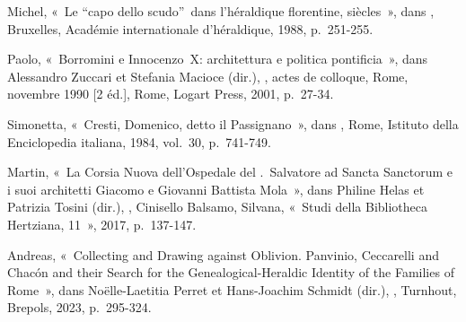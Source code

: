 \begin{teiElement}[name={TEI},change={commons\_edition}]
\begin{teiElement}[name={text},type={book},xmlid={book}]
\begin{teiElement}[name={group},type={book},xmlid={book-001}]
\begin{teiElement}[name={group},type={bibliography},data-page-title={Sources et bibliographie},data-include-href={Ch14\_Source\_bibliographie.xml},xmlid={bibliography-001}]
\begin{teiElement}[name={body}]
\begin{teiDiv}[type={section1},xmlid={div18}]
\begin{teiDiv}[type={section2},xmlid={div19}]
\begin{teiBibl}[xmlid={bibl-401}]
\end{teiBibl}
              \begin{teiBibl}[xmlid={bibl-402}]
 Michel, « Le “capo dello scudo” dans l’héraldique florentine, siècles », dans , Bruxelles, Académie internationale d’héraldique, 1988, p. 251-255.
\end{teiBibl}
              \begin{teiBibl}[xmlid={bibl-403}]
 Paolo, « Borromini e Innocenzo X: architettura e politica pontificia », dans Alessandro Zuccari et Stefania Macioce (dir.), , actes de colloque, Rome, novembre 1990 [2 éd.], Rome, Logart Press, 2001, p. 27-34.
\end{teiBibl}
              \begin{teiBibl}[xmlid={bibl-404}]
 Simonetta, « Cresti, Domenico, detto il Passignano », dans , Rome, Istituto della Enciclopedia italiana, 1984, vol. 30, p. 741-749.
\end{teiBibl}
              \begin{teiBibl}[xmlid={bibl-405}]
 Martin, « La Corsia Nuova dell’Ospedale del . Salvatore ad Sancta Sanctorum e i suoi architetti Giacomo e Giovanni Battista Mola », dans Philine Helas et Patrizia Tosini (dir.), , Cinisello Balsamo, Silvana, « Studi della Bibliotheca Hertziana, 11 », 2017, p. 137-147.
\end{teiBibl}
              \begin{teiBibl}[xmlid={bibl-406}]
 Andreas, « Collecting and Drawing against Oblivion. Panvinio, Ceccarelli and Chacón and their Search for the Genealogical-Heraldic Identity of the Families of Rome », dans Noëlle-Laetitia Perret et Hans-Joachim Schmidt (dir.), , Turnhout, Brepols, 2023, p. 295-324.
\end{teiBibl}
              \begin{teiBibl}[xmlid={bibl-407}]

\end{teiBibl}
\end{teiDiv}
\end{teiDiv}
\end{teiElement}
\end{teiElement}
\end{teiElement}
\end{teiElement}
\end{teiElement}
